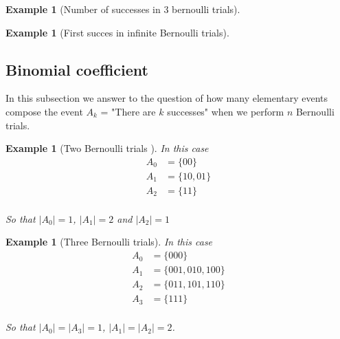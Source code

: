 \documentclass[12pt]{article}
\newtheorem{example}[theorem]{Example}
\newcommand{\<}{{\langle \!\! \langle}}
\renewcommand{\>}{{\rangle \!\! \rangle}}
\newcommand{\bel}[2]{\begin{equation} \label{#1} \begin{split} #2
 					\end{split} \end{equation}}
\begin{document}
\begin{example}[Number of successes in 3 bernoulli trials]

\end{example}


\begin{example}[First succes in infinite Bernoulli trials]

\end{example}



\subsection{Binomial coefficient}

In this subsection we answer to the question of how many elementary events compose the event $A_k$ = "There are $k$ successes" when we perform $n$ Bernoulli trials.
\begin{example}[Two Bernoulli trials ]
	In this case \bel{}{A_0 & = \{00\}\\
				A_1 & =\{10,01\}\\
				A_2 & =\{11\}\\
				}

			So that $|A_0|=1$, $|A_1 |=2$ and $|A_2 |= 1$ 
\end{example}

\begin{example}[Three Bernoulli trials]

	In this case \bel{}{A_0 & = \{000\}\\
				A_1 & =\{001,010,100\}\\
				A_2 & =\{011,101,110\}\\
				A_3 & = \{111\}\\
				}

			So that $|A_0|=|A_3| = 1 $, $|A_1 |= |A_2| =2$.
\end{example} 
\end{document}
